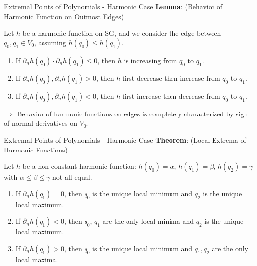 \documentclass[xcolor = dvipsnames]{beamer}
\begin{document}
\begin{frame}{Extremal Points of Polynomials - Harmonic Case}
    \textbf{Lemma}: (Behavior of Harmonic Function on Outmost Edges)
    
    Let $h$ be a harmonic function on SG, and we consider the edge between $q_{0}, q_{1}\in V_{0}$, assuming $h(q_{0})\leq h(q_{1})$.
    
    \begin{enumerate}
        \item If $\partial_{n}h(q_{0})\cdot \partial_{n}h(q_{1})\leq 0$, then $h$ is increasing from $q_{0}$ to $q_{1}$.
        \item If $\partial_{n}h(q_{0}), \partial_{n}h(q_{1})>0$, then $h$ first decrease then increase from $q_{0}$ to $q_{1}$.
        \item If $\partial_{n}h(q_{0}), \partial_{n}h(q_{1})<0$, then $h$ first increase then decrease from $q_{0}$ to $q_{1}$.
    \end{enumerate}
    
    $\Rightarrow$ Behavior of harmonic functions on edges is completely characterized by sign of normal derivatives on $V_{0}$.
\end{frame}

\begin{frame}{Extremal Points of Polynomials - Harmonic Case}
    \textbf{Theorem}: (Local Extrema of Harmonic Functions)
    
    Let $h$ be a non-constant harmonic function: $h(q_{0})=\alpha$, $h(q_{1})=\beta$, $h(q_{2})=\gamma$ with $\alpha\leq \beta\leq \gamma$ not all equal.
    
    \begin{enumerate}
        \item If $\partial_{n}h(q_{1})=0$, then $q_{0}$ is the unique local minimum and $q_{2}$ is the unique local maximum.
        \item If $\partial_{n}h(q_{1})<0$, then $q_{0}$, $q_{1}$ are the only local minima and $q_{2}$ is the unique local maximum.
        \item If $\partial_{n}h(q_{1})>0$, then $q_{0}$ is the unique local minimum and $q_{1}, q_{2}$ are the only local maxima.
    \end{enumerate}
\end{frame}
\end{document}
